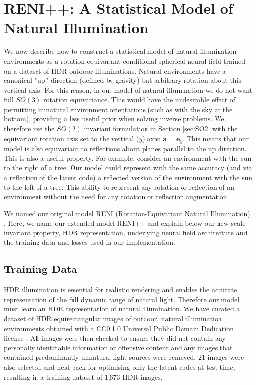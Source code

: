 \section{RENI++: A Statistical Model of Natural Illumination}\label{sec:RENI}

We now describe how to construct a statistical model of natural illumination environments as a rotation-equivariant conditional spherical neural field trained on a dataset of HDR outdoor illuminations. Natural environments have a canonical ''up'' direction (defined by gravity) but arbitrary rotation about this vertical axis. For this reason, in our model of natural illumination we do not want full $SO(3)$ rotation equivariance. This would have the undesirable effect of permitting unnatural environment orientations (such as with the sky at the bottom), providing a less useful prior when solving inverse problems. We therefore use the $SO(2)$ invariant formulation in Section \ref{sec:SO2} with the equivariant rotation axis set to the vertical ($y$) axis: $\mathbf{a}=\mathbf{e}_y$. This means that our model is also equivariant to reflections about planes parallel to the up direction. This is also a useful property. For example, consider an environment with the sun to the right of a tree. Our model could represent with the same accuracy (and via a reflection of the latent code) a reflected version of the environment with the sun to the left of a tree. This ability to represent any rotation or reflection of an environment without the need for any rotation or reflection augmentation.

We named our original model RENI (Rotation-Equivariant Natural Illumination) \cite{gardner2022rotation}. Here, we name our extended model RENI++ and explain below our new scale-invariant property, HDR representation, underlying neural field architecture and the training data and losses used in our implementation.

\subsection{Training Data} 
\label{Training Data}
HDR illumination is essential for realistic rendering and enables the accurate representation of the full dynamic range of natural light. Therefore our model must learn an HDR representation of natural illumination. We have curated a dataset of HDR equirectangular images of outdoor, natural illumination environments obtained with a CC0 1.0 Universal Public Domain Dedication license \cite{poly_haven_hdris_nodate, giantcowfilms_hdris_nodate, ihdri_hdris_nodate, hdrmaps_hdris_nodate, whitemagus_3d_hdris_nodate, hdri_skies_hdris_nodate, textures_hdris_nodate}. All images were then checked to ensure they did not contain any personally identifiable information or offensive content and any images that contained predominantly unnatural light sources were removed. $21$ images were also selected and held back for optimising only the latent codes at test time, resulting in a training dataset of 1,673 HDR images.


